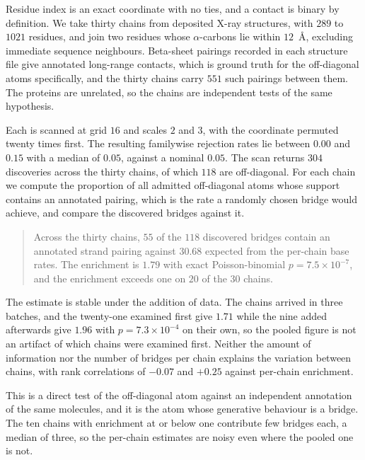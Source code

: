 \documentclass[11pt]{article}
\theoremstyle{definition}
\newcommand{\1}{\mathbf 1}\newcommand{\op}{\operatorname}
\begin{document}
Residue index is an exact coordinate with no ties, and a contact is binary by
definition.  We take thirty chains from deposited X-ray structures, with $289$
to $1021$ residues, and join two residues whose $\alpha$-carbons lie within
$12$~\AA, excluding immediate sequence neighbours.  Beta-sheet pairings
recorded in each structure file give annotated long-range contacts, which is
ground truth for the off-diagonal atoms specifically, and the thirty chains
carry $551$ such pairings between them.  The proteins are unrelated, so the
chains are independent tests of the same hypothesis.

Each is scanned at grid $16$ and scales $2$ and $3$, with the coordinate
permuted twenty times first.  The resulting familywise rejection rates lie
between $0.00$ and $0.15$ with a median of $0.05$, against a nominal $0.05$.
The scan returns $304$ discoveries across the thirty chains, of which $118$
are off-diagonal.  For each chain we compute the proportion of all admitted
off-diagonal atoms whose support contains an annotated pairing, which is the
rate a randomly chosen bridge would achieve, and compare the discovered
bridges against it.

\begin{quote}
Across the thirty chains, $55$ of the $118$ discovered bridges contain an
annotated strand pairing against $30.68$ expected from the per-chain base
rates.  The enrichment is $1.79$ with exact Poisson-binomial
$p=7.5\times10^{-7}$, and the enrichment exceeds one on $20$ of the $30$
chains.
\end{quote}

The estimate is stable under the addition of data.  The chains arrived in
three batches, and the twenty-one examined first give $1.71$ while the nine
added afterwards give $1.96$ with $p=7.3\times10^{-4}$ on their own, so the
pooled figure is not an artifact of which chains were examined first.  Neither
the amount of information nor the number of bridges per chain explains the
variation between chains, with rank correlations of $-0.07$ and $+0.25$
against per-chain enrichment.

This is a direct test of the off-diagonal atom against an independent
annotation of the same molecules, and it is the atom whose generative
behaviour is a bridge.  The ten chains with enrichment at or below one
contribute few bridges each, a median of three, so the per-chain estimates are
noisy even where the pooled one is not.
\end{document}
